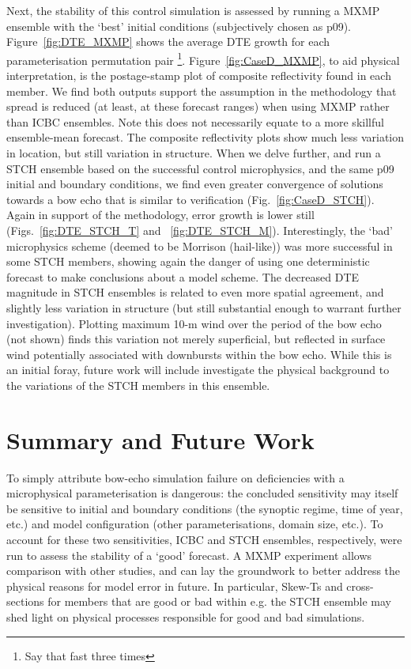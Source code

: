 \documentclass{ametsoc}
\begin{document}
Next, the stability of this control simulation is assessed by running a MXMP ensemble with the `best' initial conditions (subjectively chosen as p09). Figure~\ref{fig:DTE_MXMP} shows the average DTE growth for each parameterisation permutation pair \footnote{Say that fast three times}. Figure~\ref{fig:CaseD_MXMP}, to aid physical interpretation, is the postage-stamp plot of composite reflectivity found in each member. We find both outputs support the assumption in the methodology that spread is reduced (at least, at these forecast ranges) when using MXMP rather than ICBC ensembles. Note this does not necessarily equate to a more skillful ensemble-mean forecast. The composite reflectivity plots show much less variation in location, but still variation in structure. When we delve further, and run a STCH ensemble based on the successful control microphysics, and the same p09 initial and boundary conditions, we find even greater convergence of solutions towards a bow echo that is similar to verification (Fig.~\ref{fig:CaseD_STCH}). Again in support of the methodology, error growth is lower still (Figs.~\ref{fig:DTE_STCH_T} and ~\ref{fig:DTE_STCH_M}). Interestingly, the `bad' microphysics scheme (deemed to be Morrison (hail-like)) was more successful in some STCH members, showing again the danger of using one deterministic forecast to make conclusions about a model scheme. The decreased DTE magnitude in STCH ensembles is related to even more spatial agreement, and slightly less variation in structure (but still substantial enough to warrant further investigation). Plotting maximum 10-m wind over the period of the bow echo (not shown) finds this variation not merely superficial, but reflected in surface wind potentially associated with downbursts within the bow echo. While this is an initial foray, future work will include investigate the physical background to the variations of the STCH members in this ensemble.

\section{Summary and Future Work}  \label{sec:futurework}
To simply attribute bow-echo simulation failure on deficiencies with a microphysical parameterisation is dangerous: the concluded sensitivity may itself be sensitive to initial and boundary conditions (the synoptic regime, time of year, etc.) and model configuration (other parameterisations, domain size, etc.). To account for these two sensitivities, ICBC and STCH ensembles, respectively, were run to assess the stability of a `good' forecast. A MXMP experiment allows comparison with other studies, and can lay the groundwork to better address the physical reasons for model error in future. In particular, Skew-Ts and cross-sections for members that are good or bad within e.g. the STCH ensemble may shed light on physical processes responsible for good and bad simulations.
\end{document}
